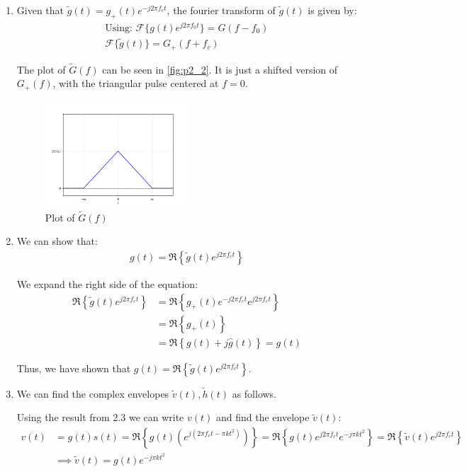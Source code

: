 \documentclass{article}
\begin{document}
\begin{enumerate}[label=2.\arabic*]
\item Given that $\tilde{g}(t) = g_+(t)e^{-j2\pi f_c t}$, the fourier transform of $\tilde{g}(t)$ is given by:
\begin{align*}
        \text{Using: } \mathcal{F}\{g(t)e^{j2\pi f_0 t}\} = G(f-f_0) \\
        \mathcal{F}\{\tilde{g}(t)\} = G_+(f+f_c)
\end{align*}

The plot of $\tilde{G}(f)$ can be seen in \autoref{fig:p2_2}. It is just a shifted version of $G_+(f)$, with the triangular pulse centered at $f = 0$.
\begin{figure}
    \centering
    \includegraphics[width=0.5\textwidth]{p2_2.png}
    \caption{Plot of $\tilde{G}(f)$}
    \label{fig:p2_2}
\end{figure}

\item We can show that:
\begin{align*}
    g(t) = \mathfrak{R}\left\{\tilde{g}(t)e^{j2\pi f_c t}\right\} 
\end{align*}

We expand the right side of the equation:
\begin{align*}
    \mathfrak{R}\left\{\tilde{g}(t)e^{j2\pi f_c t}\right\} &= \mathfrak{R}\left\{g_+(t)e^{-j2\pi f_c t}e^{j2\pi f_c t}\right\} \\
    &= \mathfrak{R}\left\{g_+(t)\right\} \\
    &= \mathfrak{R}\left\{g(t) + j\hat{g}(t)\right\} = g(t)
\end{align*}

    Thus, we have shown that $g(t) = \mathfrak{R}\left\{\tilde{g}(t)e^{j2\pi f_c t}\right\}$.

    \item We can find the complex envelopes $\tilde{v}(t), \tilde{h}(t)$ as follows.
    
    Using the result from 2.3 we can write $v(t)$ and find the envelope $\tilde{v}(t)$:
    \begin{align*}
        v(t) &= g(t)s(t) = \mathfrak{R}\left\{g(t)\left(e^{j(2\pi f_c t - \pi k t^2)}\right)\right\} = \mathfrak{R} \left\{g(t)e^{j2\pi f_c t}e^{-j\pi k t^2}\right\} = \mathfrak{R}\left\{\tilde{v}(t)e^{j2\pi f_c t}\right\} \\
        &\implies \tilde{v}(t) = g(t)e^{-j\pi k t^2}
    \end{align*}


\end{enumerate}
\end{document}
